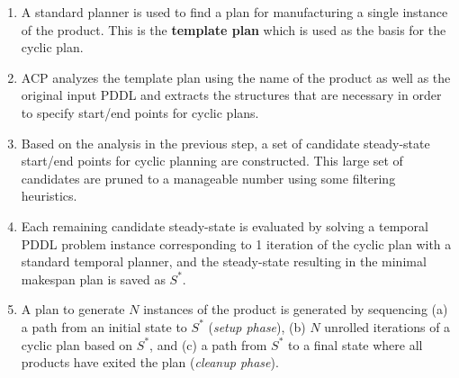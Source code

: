 \begin{enumerate}
\item A standard \domind planner %
is used to find a plan for manufacturing a single instance of the product. This is the {\bf template plan} which is used as the basis for the cyclic plan.


\item ACP analyzes the template plan using the name of the product as well as the original input PDDL and extracts the structures that are necessary in order to specify start/end points for cyclic plans.

\item Based on the analysis in the previous step, a set of candidate steady-state start/end points for cyclic planning are constructed. This large set of candidates are pruned to a manageable number using some filtering heuristics. 

\item Each remaining candidate steady-state  is evaluated by solving a temporal PDDL problem instance corresponding to 1 iteration of the cyclic plan %
with  a standard temporal planner, and the steady-state resulting in the minimal makespan plan is saved as $S^*$.

\item A plan to generate $N$ instances of the product is generated by sequencing (a) a path from an initial state to $S^*$ ({\em setup phase}), (b) $N$ unrolled iterations of a cyclic plan based on $S^*$, and (c) a path  from $S^*$ to a final state where all products have exited the plan ({\em cleanup phase}).
\end{enumerate}





